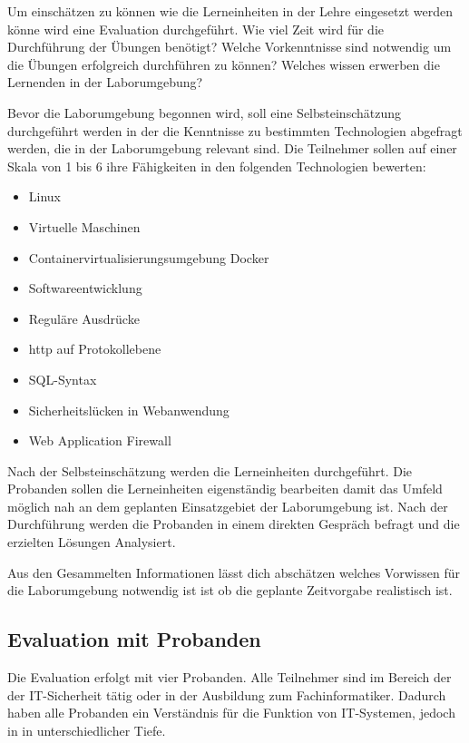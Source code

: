 Um einschätzen zu können wie die Lerneinheiten in der Lehre eingesetzt werden könne wird eine Evaluation durchgeführt.
Wie viel Zeit wird für die Durchführung der Übungen benötigt?
Welche Vorkenntnisse sind notwendig um die Übungen erfolgreich durchführen zu können?
Welches wissen erwerben die Lernenden in der Laborumgebung?

Bevor die Laborumgebung begonnen wird, soll eine Selbsteinschätzung durchgeführt werden in der die Kenntnisse zu bestimmten Technologien abgefragt werden, die in der Laborumgebung relevant sind.
Die Teilnehmer sollen auf einer Skala von 1 bis 6 ihre Fähigkeiten in den folgenden Technologien bewerten:

\begin{itemize}
    \item Linux
    \item Virtuelle Maschinen
    \item Containervirtualisierungsumgebung Docker
    \item Softwareentwicklung
    \item Reguläre Ausdrücke
    \item \ac{http} auf Protokollebene
    \item SQL-Syntax
    \item Sicherheitslücken in Webanwendung
    \item Web Application Firewall
\end{itemize}

Nach der Selbsteinschätzung werden die Lerneinheiten durchgeführt.
Die Probanden sollen die Lerneinheiten eigenständig bearbeiten damit das Umfeld möglich nah an dem geplanten Einsatzgebiet der Laborumgebung ist.
Nach der Durchführung werden die Probanden in einem direkten Gespräch befragt und die erzielten Lösungen Analysiert.

Aus den Gesammelten Informationen lässt dich abschätzen welches Vorwissen für die Laborumgebung notwendig ist ist ob die geplante Zeitvorgabe realistisch ist.

\subsection{Evaluation mit Probanden}

Die Evaluation erfolgt mit vier Probanden.
Alle Teilnehmer sind im Bereich der der IT-Sicherheit tätig oder in der Ausbildung zum Fachinformatiker.
Dadurch haben alle Probanden ein Verständnis für die Funktion von IT-Systemen, jedoch in in unterschiedlicher Tiefe.

